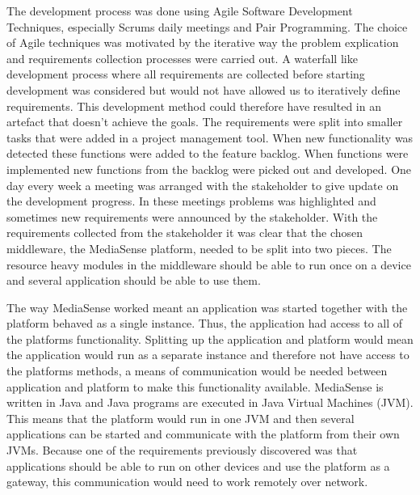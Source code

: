 The development process was done using Agile Software Development Techniques, especially Scrums daily meetings and Pair Programming. The choice of Agile techniques was motivated by the iterative way the problem explication and requirements collection processes were carried out. A waterfall like development process where all requirements are collected before starting development was considered but would not have allowed us to iteratively define requirements. This development method could therefore have resulted in an artefact that doesn't achieve the goals.
The requirements were split into smaller tasks that were added in a project management tool. When new functionality was detected these functions were added to the feature backlog. When functions were implemented new functions from the backlog were picked out and developed. One day every week a meeting was arranged with the stakeholder to give update on the development progress. In these meetings problems was highlighted and sometimes new requirements were announced by the stakeholder. With the requirements collected from the stakeholder it was clear that the chosen middleware, the MediaSense platform, needed to be split into two pieces. The resource heavy modules in the middleware should be able to run once on a device and several application should be able to use them. 

The way MediaSense worked meant an application was started together with the platform behaved as a single instance. Thus, the application had access to all of the platforms functionality. Splitting up the application and platform would mean the application would run as a separate instance and therefore not have access to the platforms methods, a means of communication would be needed between application and platform to make this functionality available. MediaSense is written in Java and Java programs are executed in Java Virtual Machines (JVM). This means that the platform would run in one JVM and then several applications can be started and communicate with the platform from their own JVMs. Because one of the requirements previously discovered was that applications should be able to run on other devices and use the platform as a gateway, this communication would need to work remotely over network.

